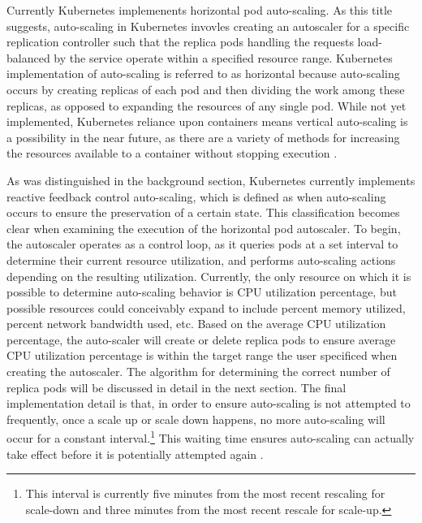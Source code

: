 Currently Kubernetes implemenents horizontal pod auto-scaling.
As this title suggests, auto-scaling in
Kubernetes invovles creating an autoscaler for a specific replication
controller such that the replica pods handling the requests load-balanced by the service
operate within a specified resource range. Kubernetes
implementation of auto-scaling is referred to as horizontal because
auto-scaling occurs by creating replicas of each pod and then dividing the work
among these replicas, as opposed to expanding the resources of any single pod.
While not yet implemented, Kubernetes reliance upon containers means vertical
auto-scaling is a possibility in the near future, as there are a variety of
methods for increasing the resources available to a container without stopping
execution \cite{docker-up-and-running}.

As was distinguished in the background section, Kubernetes currently implements reactive
feedback control auto-scaling, which is defined as when auto-scaling occurs to
ensure the preservation of a certain state.
This classification becomes clear when examining
the execution of the horizontal pod autoscaler. To begin, the autoscaler
operates as a control loop, as it queries pods at a set interval to determine
their current resource utilization, and performs auto-scaling actions depending on the
resulting utilization. Currently, the only resource on which it is possible to
determine auto-scaling behavior is CPU utilization percentage, but possible
resources could conceivably expand to include percent memory utilized, percent
network bandwidth used, etc. Based on the average CPU utilization percentage, the
auto-scaler will create or delete replica pods to ensure average CPU utilization
percentage is within the target range the user specificed when creating the
autoscaler. The algorithm for determining the correct number of replica pods
will be discussed in detail in the next section. The final implementation detail
is that, in order to ensure auto-scaling is not attempted to frequently, once a
scale up or scale down happens, no more auto-scaling will occur for a constant
interval.\footnote{This interval is currently five minutes from the most recent
rescaling for scale-down and three minutes from the most recent rescale for
scale-up.} This waiting time ensures auto-scaling can actually take effect
before it is potentially attempted again \cite{k8s-horizontal-pod-autoscaler-user-guide}.
